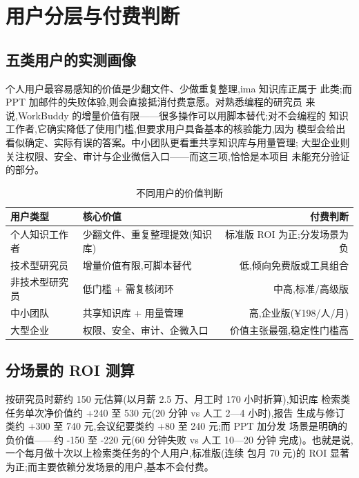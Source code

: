\documentclass[
  12pt,
  a4paper,
  oneside,
  headings=normal,
  numbers=noendperiod,
  listof=totoc,
  bibliography=totoc
]{scrreprt}
\newenvironment{hfhtable}[1][htbp]
  {\begin{table}[#1]\centering\footnotesize\setstretch{1}}
  {\end{table}}
\newcommand{\source}[1]{%
  \par\vspace{3pt}{\footnotesize
    数据来源: #1\par}}
\begin{document}
\chapter{用户分层与付费判断}

\section{五类用户的实测画像}

个人用户最容易感知的价值是少翻文件、少做重复整理,ima 知识库正属于
此类;而 PPT 加邮件的失败体验,则会直接抵消付费意愿。对熟悉编程的研究员
来说,WorkBuddy 的增量价值有限——很多操作可以用脚本替代;对不会编程的
知识工作者,它确实降低了使用门槛,但要求用户具备基本的核验能力,因为
模型会给出看似确定、实际有误的答案。中小团队更看重共享知识库与用量管理;
大型企业则关注权限、安全、审计与企业微信入口——而这三项,恰恰是本项目
未能充分验证的部分。

\begin{hfhtable}
  \caption{不同用户的价值判断}
  \label{tab:users}
  \begin{tabularx}{\textwidth}{@{}YYr@{}}
    \toprule
    \textbf{用户类型} & \textbf{核心价值} & \textbf{付费判断} \\
    \midrule
    个人知识工作者 & 少翻文件、重复整理提效(知识库) & 标准版 ROI 为正;分发场景为负 \\
    技术型研究员 & 增量价值有限,可脚本替代 & 低,倾向免费版或工具组合 \\
    非技术型研究员 & 低门槛 + 需复核闭环 & 中高,标准/高级版 \\
    中小团队 & 共享知识库 + 用量管理 & 高,企业版(¥198/人/月) \\
    大型企业 & 权限、安全、审计、企微入口 & 价值主张最强,稳定性门槛高 \\
    \bottomrule
  \end{tabularx}
  \source{基于本报告全部实测的用户价值判断}
\end{hfhtable}

\section{分场景的 ROI 测算}

按研究员时薪约 150 元估算(以月薪 2.5 万、月工时 170 小时折算),知识库
检索类任务单次净价值约 +240 至 530 元(20 分钟 vs 人工 2—4 小时),报告
生成与修订类约 +300 至 740 元,会议纪要类约 +80 至 240 元;而 PPT 加分发
场景是明确的负价值——约 -150 至 -220 元(60 分钟失败 vs 人工 10—20 分钟
完成)。也就是说,一个每月做十次以上检索类任务的个人用户,标准版(连续
包月 70 元)的 ROI 显著为正;而主要依赖分发场景的用户,基本不会付费。
\end{document}
